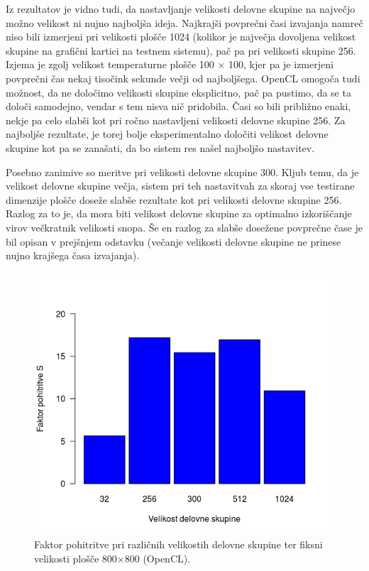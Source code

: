 \documentclass[a4paper,titlepage,11pt]{article}
\begin{document}
Iz rezultatov je vidno tudi, da nastavljanje velikosti delovne skupine na največjo možno velikost ni nujno najboljša ideja. Najkrajši povprečni časi izvajanja namreč niso bili izmerjeni pri velikosti plošče 1024 (kolikor je največja dovoljena velikost skupine na grafični kartici na testnem sistemu), pač pa pri velikosti skupine 256. Izjema je zgolj velikost temperaturne plošče 100 $\times$ 100, kjer pa je izmerjeni povprečni čas nekaj tisočink sekunde večji od najboljšega. OpenCL omogoča tudi možnost, da ne določimo velikosti skupine eksplicitno, pač pa pustimo, da se ta določi samodejno, vendar s tem nisva nič pridobila. Časi so bili približno enaki, nekje pa celo slabši kot pri ročno nastavljeni velikosti delovne skupine 256. Za najboljše rezultate, je torej bolje eksperimentalno določiti velikost delovne skupine kot pa se zanašati, da bo sistem res našel najboljšo nastavitev.

Posebno zanimive so meritve pri velikosti delovne skupine 300. Kljub temu, da je velikost delovne skupine večja, sistem pri teh nastavitvah za skoraj vse testirane dimenzije plošče doseže slabše rezultate kot pri velikosti delovne skupine 256. Razlog za to je, da mora biti velikost delovne skupine za optimalno izkoriščanje virov večkratnik velikosti snopa. Še en razlog za slabše dosežene povprečne čase je bil opisan v prejšnjem odstavku (večanje velikosti delovne skupine ne prinese nujno krajšega časa izvajanja).
 
\begin{figure}[H]
\begin{center}
\includegraphics[scale=0.55]{graf-rezultati-4_2.png}
\caption{Faktor pohitritve pri različnih velikostih delovne skupine ter fiksni velikosti plošče 800$\times$800 (OpenCL).}
\label{graf-rezultati-pohitritev-4}
\end{center}
\vspace{-25pt}
\end{figure}
\end{document}
